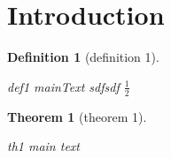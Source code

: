 \documentclass{article}
\newcommand{\depends}[1]{}
\newcommand{\summary}[1]{}
\newcommand{\mainText}[1]{#1}
\newtheorem{theorem}{Theorem}
\newtheorem{definition}{Definition}
\begin{document}
\section{Introduction}
\label{sec:intro}

\begin{definition}[definition 1]
    \label{def:def1}
    \summary{def1 summary qsd}
    \mainText{def1 mainText sdfsdf $\frac{1}{2}$}
\end{definition}

\begin{theorem}[theorem 1]
    \label{th:th1}
    \depends{def:def1}
    \summary{th1 summary}
    \mainText{th1 main text}
\end{theorem}
\end{document}

